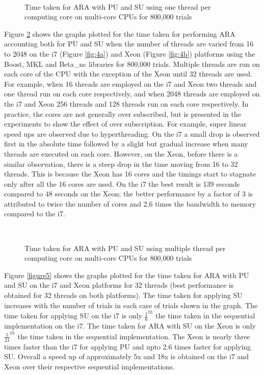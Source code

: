 \begin{figure} \centering
	 \\
\caption{Time taken for ARA with PU and SU using one thread per computing core on multi-core CPUs for 800,000 trials}
\label{figure3}
\end{figure}

Figure \ref{figure4} shows the graphs plotted for the time taken for performing ARA accounting both for PU and SU when the number of threads are varied from 16 to 2048 on the i7 (Figure \ref{fig:4a}) and Xeon (Figure \ref{fig:4b}) platforms using the Boost, MKL and Beta\_nc libraries for 800,000 trials. 
Multiple threads are run on each core of the CPU with the exception of the Xeon until 32 threads are used. 
For example, when 16 threads are employed on the i7 and Xeon two threads and one thread run on each core respectively, and when 2048 threads are employed on the i7 and Xeon 256 threads and 128 threads run on each core respectively. 
In practice, the cores are not generally over subscribed, but is presented in the experiments to show the effect of over subscription.
For example, super linear speed ups are observed due to hyperthreading. 
On the i7 a small drop is observed first in the absolute time followed by a slight but gradual increase when many threads are executed on each core. 
However, on the Xeon, before there is a similar observation, there is a steep drop in the time moving from 16 to 32 threads. 
This is because the Xeon has 16 cores and the timings start to stagnate only after all the 16 cores are used. 
On the i7 the best result is 139 seconds compared to 48 seconds on the Xeon; the better performance by a factor of 3 is attributed to twice the number of cores and 2.6 times the bandwidth to memory compared to the i7.

\begin{figure} \centering
	 \\
\caption{Time taken for ARA with PU and SU using multiple thread per computing core on multi-core CPUs for 800,000 trials}
\label{figure4}
\end{figure}

Figure \ref{figure5} shows the graphs plotted for the time taken for ARA with PU and SU on the i7 and Xeon platforms for 32 threads (best performance is obtained for 32 threads on both platforms). The time taken for applying SU increases with the number of trials in each case of trials shown in the graph. The time taken for applying SU on the i7 is only $\frac{1}{6}^{th}$ the time taken in the sequential implementation on the i7. The time taken for ARA with SU on the Xeon is only $\frac{1}{21}^{th}$ the time taken in the sequential implementation. The Xeon is nearly three times faster than the i7 for applying PU and upto 2.6 times faster for applying SU. Overall a speed up of approximately 5x and 18x is obtained on the i7 and Xeon over their respective sequential implementations.

